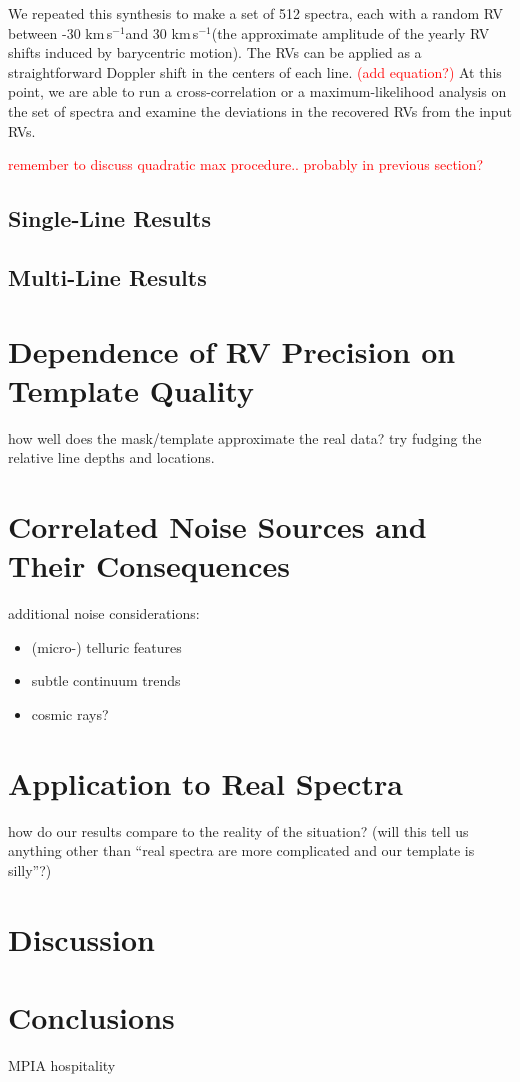 \documentclass[modern]{aastex61}
\newcommand{\kms}{km\,s$^{-1}$}
\newcommand\todo[1]{\textcolor{red}{#1}}  %
\begin{document}
We repeated this synthesis to make a set of 512 spectra, each with a random RV between -30 \kms and 30 \kms (the approximate amplitude of the yearly RV shifts induced by barycentric motion). The RVs can be applied as a straightforward Doppler shift in the centers of each line. \todo{(add equation?)} At this point, we are able to run a cross-correlation or a maximum-likelihood analysis on the set of spectra and examine the deviations in the recovered RVs from the input RVs.

\todo{remember to discuss quadratic max procedure.. probably in previous section?}

\subsection{Single-Line Results}

\subsection{Multi-Line Results}

\section{Dependence of RV Precision on Template Quality}

how well does the mask/template approximate the real data? try fudging the relative line depths and locations.

\section{Correlated Noise Sources and Their Consequences}

additional noise considerations:
\begin{itemize}
\item (micro-) telluric features
\item subtle continuum trends
\item cosmic rays?
\end{itemize}

\section{Application to Real Spectra}

how do our results compare to the reality of the situation? (will this tell us anything other than ``real spectra are more complicated and our template is silly''?)

\section{Discussion}

\section{Conclusions}

\acknowledgements
MPIA hospitality


\end{document}
